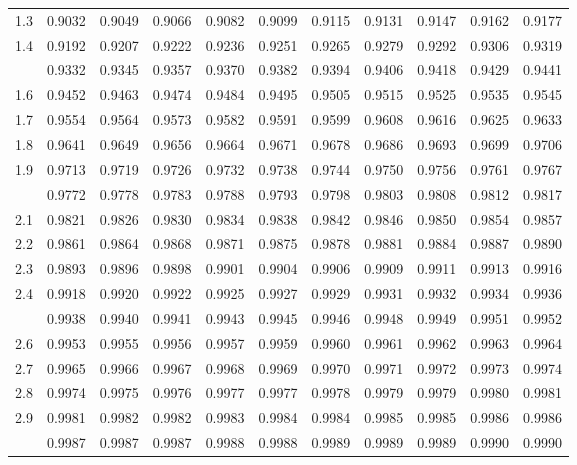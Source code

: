 \documentclass[
  11pt,
]{book}
\theoremstyle{definition}
\theoremstyle{definition}
\theoremstyle{definition}
\theoremstyle{definition}
\theoremstyle{remark}
\begin{document}
\begin{longtable}[t]{lrrrrrrrrrr}
1.3 & 0.9032 & 0.9049 & 0.9066 & 0.9082 & 0.9099 & 0.9115 & 0.9131 & 0.9147 & 0.9162 & 0.9177\\
1.4 & 0.9192 & 0.9207 & 0.9222 & 0.9236 & 0.9251 & 0.9265 & 0.9279 & 0.9292 & 0.9306 & 0.9319\\
\addlinespace
1.5 & 0.9332 & 0.9345 & 0.9357 & 0.9370 & 0.9382 & 0.9394 & 0.9406 & 0.9418 & 0.9429 & 0.9441\\
1.6 & 0.9452 & 0.9463 & 0.9474 & 0.9484 & 0.9495 & 0.9505 & 0.9515 & 0.9525 & 0.9535 & 0.9545\\
1.7 & 0.9554 & 0.9564 & 0.9573 & 0.9582 & 0.9591 & 0.9599 & 0.9608 & 0.9616 & 0.9625 & 0.9633\\
1.8 & 0.9641 & 0.9649 & 0.9656 & 0.9664 & 0.9671 & 0.9678 & 0.9686 & 0.9693 & 0.9699 & 0.9706\\
1.9 & 0.9713 & 0.9719 & 0.9726 & 0.9732 & 0.9738 & 0.9744 & 0.9750 & 0.9756 & 0.9761 & 0.9767\\
\addlinespace
2.0 & 0.9772 & 0.9778 & 0.9783 & 0.9788 & 0.9793 & 0.9798 & 0.9803 & 0.9808 & 0.9812 & 0.9817\\
2.1 & 0.9821 & 0.9826 & 0.9830 & 0.9834 & 0.9838 & 0.9842 & 0.9846 & 0.9850 & 0.9854 & 0.9857\\
2.2 & 0.9861 & 0.9864 & 0.9868 & 0.9871 & 0.9875 & 0.9878 & 0.9881 & 0.9884 & 0.9887 & 0.9890\\
2.3 & 0.9893 & 0.9896 & 0.9898 & 0.9901 & 0.9904 & 0.9906 & 0.9909 & 0.9911 & 0.9913 & 0.9916\\
2.4 & 0.9918 & 0.9920 & 0.9922 & 0.9925 & 0.9927 & 0.9929 & 0.9931 & 0.9932 & 0.9934 & 0.9936\\
\addlinespace
2.5 & 0.9938 & 0.9940 & 0.9941 & 0.9943 & 0.9945 & 0.9946 & 0.9948 & 0.9949 & 0.9951 & 0.9952\\
2.6 & 0.9953 & 0.9955 & 0.9956 & 0.9957 & 0.9959 & 0.9960 & 0.9961 & 0.9962 & 0.9963 & 0.9964\\
2.7 & 0.9965 & 0.9966 & 0.9967 & 0.9968 & 0.9969 & 0.9970 & 0.9971 & 0.9972 & 0.9973 & 0.9974\\
2.8 & 0.9974 & 0.9975 & 0.9976 & 0.9977 & 0.9977 & 0.9978 & 0.9979 & 0.9979 & 0.9980 & 0.9981\\
2.9 & 0.9981 & 0.9982 & 0.9982 & 0.9983 & 0.9984 & 0.9984 & 0.9985 & 0.9985 & 0.9986 & 0.9986\\
\addlinespace
3.0 & 0.9987 & 0.9987 & 0.9987 & 0.9988 & 0.9988 & 0.9989 & 0.9989 & 0.9989 & 0.9990 & 0.9990\\*
\end{longtable}
\endgroup{}
\end{document}
